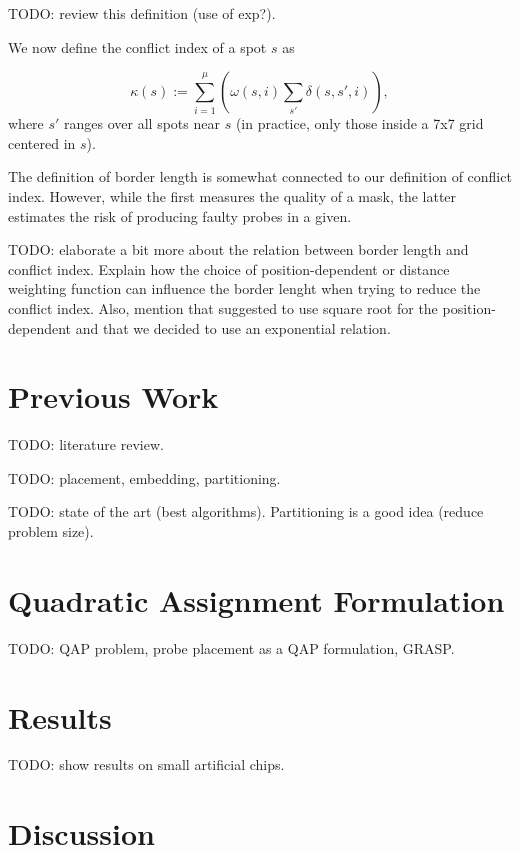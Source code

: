\documentclass{bioinfo}
\begin{document}
TODO: review this definition (use of exp?).

We now define the conflict index of a spot $s$ as

\begin{equation}
\label{eq:conf_idx} \kappa(s) := \sum_{i=1}^{\mu} \left( \omega(s,i) \sum_{s'} \delta(s,s',i) \right),
\end{equation}
where $s'$ ranges over all spots near $s$ (in practice, only those inside a 7x7 grid centered in $s$).

The definition of border length is somewhat connected to our definition of conflict index. However, while the first measures the quality of a mask, the latter estimates the risk of producing faulty probes in a given.

TODO: elaborate a bit more about the relation between border length and conflict index. Explain how the choice of position-dependent or distance weighting function can influence the border lenght when trying to reduce the conflict index. Also, mention that \citealp{KAHNG03_1} suggested to use square root for the position-dependent and that we decided to use an exponential relation.

\section{Previous Work}

TODO: literature review.

TODO: placement, embedding, partitioning.

TODO: state of the art (best algorithms). Partitioning is a good idea (reduce problem size).

\section{Quadratic Assignment Formulation}

TODO: QAP problem, probe placement as a QAP formulation, GRASP.

\section{Results}

TODO: show results on small artificial chips.

\section{Discussion}
\end{document}
